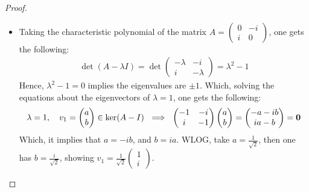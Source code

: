 \documentclass{article}
\begin{document}
\begin{proof}
    \begin{itemize}
        \item[(a)] Taking the characteristic polynomial of the matrix $A=\begin{pmatrix}
            0&-i\\i&0
        \end{pmatrix}$, one gets the following:
        \begin{align}
            \det(A-\lambda I) = \det\begin{pmatrix}
                -\lambda & -i\\i & -\lambda
            \end{pmatrix} = \lambda^2-1
        \end{align}
        Hence, $\lambda^2-1 = 0$ implies the eigenvalues are $\pm 1$. Which, solving the equations about the eigenvectors of $\lambda=1$, one gets the following:
        \begin{align}
            \lambda=1,\quad v_1=\begin{pmatrix}
                a\\b
            \end{pmatrix} \in \ker(A-I)\ \implies\ \begin{pmatrix}
                -1&-i\\i&-1
            \end{pmatrix}\begin{pmatrix}
                a\\b
            \end{pmatrix} = \begin{pmatrix}
                -a-ib\\ia-b
            \end{pmatrix}=\mathbf{0}
        \end{align}
        Which, it implies that $a=-ib$, and $b = ia$. WLOG, take $a=\frac{1}{\sqrt{2}}$, then one has $b = \frac{i}{\sqrt{2}}$, showing $v_1 = \frac{1}{\sqrt{2}}\begin{pmatrix}
            1\\i
        \end{pmatrix}$.


\end{itemize}
\end{proof}
\end{document}
